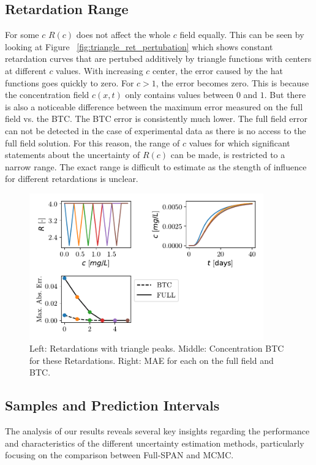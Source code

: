 \subsection{Retardation Range} %
For some $c$ $R(c)$ does not affect the whole $c$ field equally. This can be seen by looking at Figure ~\vref{fig:triangle_ret_pertubation} which shows constant retardation curves that are pertubed additively by triangle functions with centers at different $c$ values. With increasing $c$ center, the error caused by the hat functions goes quickly to zero. For $c > 1$, the error becomes zero. This is because the concentration field $c(x,t)$ only contains values between $0$ and $1$. But there is also a noticeable difference between the maximum error measured on the full field vs. the BTC. The BTC error is consistently much lower.
The full field error can not be detected in the case of experimental data as there is no access to the full field solution. For this reason, the range of $c$ values for which significant statements about the uncertainty of $R(c)$ can be made, is restricted to a narrow range. The exact range is difficult to estimate as the stength of influence for different retardations is unclear.


\begin{figure}
    \centering
    \includegraphics[width=0.9\textwidth]{figs/triangle_ret_pertubation.pdf}
    \caption{Left: Retardations with triangle peaks. Middle: Concentration BTC for these Retardations. Right: MAE for each on the full field and BTC.}
    \label{fig:triangle_ret_pertubation}
\end{figure}


\subsection{Samples and Prediction Intervals}
The analysis of our results reveals several key insights regarding the performance and characteristics of the different uncertainty estimation methods, particularly focusing on the comparison between Full-SPAN and MCMC.

